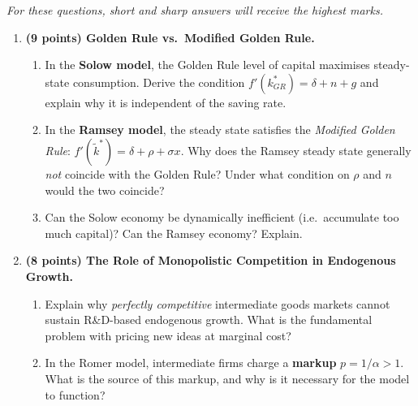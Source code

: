 \documentclass[a4paper,11pt]{article}
\newcommand{\ktilde}{\tilde{k}}
\begin{document}
\noindent\textit{For these questions, short and sharp answers will receive the highest marks.}

\vspace{8pt}

\begin{enumerate}[label=\textbf{\arabic*.}, leftmargin=*, itemsep=14pt]

    \item \textbf{(9 points) Golden Rule vs.\ Modified Golden Rule.}

    \begin{enumerate}[label=(\alph*), itemsep=6pt]
        \item In the \textbf{Solow model}, the Golden Rule level of capital maximises
        steady-state consumption.  Derive the condition $f'(k^*_{GR}) = \delta + n + g$
        and explain why it is independent of the saving rate.

        \item In the \textbf{Ramsey model}, the steady state satisfies the
        \emph{Modified Golden Rule}: $f'(\ktilde^*) = \delta + \rho + \sigma x$.
        Why does the Ramsey steady state generally \emph{not} coincide with the Golden
        Rule?  Under what condition on $\rho$ and $n$ would the two coincide?

        \item Can the Solow economy be dynamically inefficient (i.e.\ accumulate too
        much capital)?  Can the Ramsey economy?  Explain.
    \end{enumerate}

    \item \textbf{(8 points) The Role of Monopolistic Competition in Endogenous Growth.}

    \begin{enumerate}[label=(\alph*), itemsep=6pt]
        \item Explain why \emph{perfectly competitive} intermediate goods markets
        cannot sustain R\&D-based endogenous growth.  What is the fundamental problem
        with pricing new ideas at marginal cost?

        \item In the Romer model, intermediate firms charge a \textbf{markup}
        $p = 1/\alpha > 1$.  What is the source of this markup, and why is it necessary
        for the model to function?


\end{enumerate}
\end{enumerate}
\end{document}
